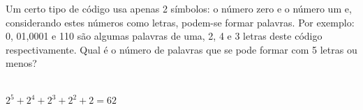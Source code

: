 \begin{ex}
Um certo tipo de código usa apenas 2 símbolos: o número zero e o número um e, considerando estes números como letras, podem-se formar palavras. Por exemplo: 0, 01,0001 e 110 são algumas palavras de uma, 2, 4 e 3 letras deste código respectivamente. Qual é o número de palavras que se pode formar com 5 letras ou menos?
  \begin{sol}
    \phantom{A}  \\
    $2^5+2^4+2^3+2^2+2=62$
  \end{sol}
\end{ex}